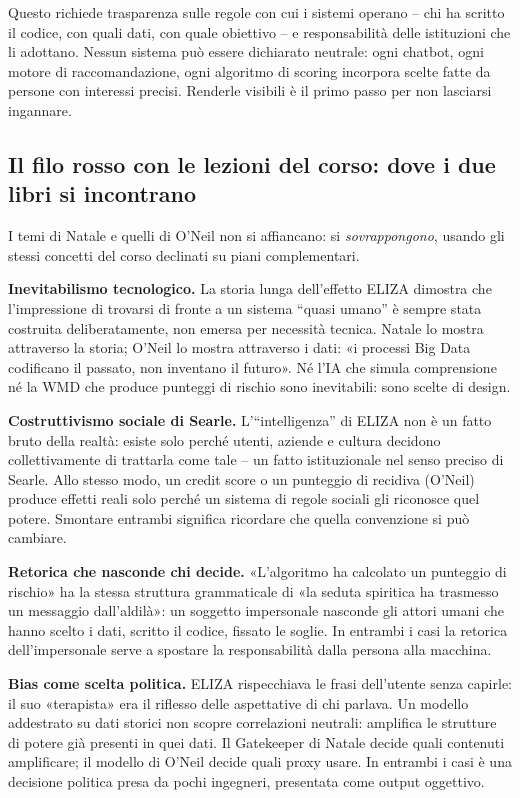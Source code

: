 \documentclass[a4paper,11pt]{article}
\begin{document}
Questo richiede trasparenza sulle regole con cui i sistemi operano -- chi ha scritto il codice, con quali dati, con quale obiettivo -- e responsabilità delle istituzioni che li adottano. Nessun sistema può essere dichiarato neutrale: ogni chatbot, ogni motore di raccomandazione, ogni algoritmo di scoring incorpora scelte fatte da persone con interessi precisi. Renderle visibili è il primo passo per non lasciarsi ingannare.

\subsection{Il filo rosso con le lezioni del corso: dove i due libri si incontrano}

I temi di Natale e quelli di O'Neil non si affiancano: si \emph{sovrappongono}, usando gli stessi concetti del corso declinati su piani complementari.

\textbf{Inevitabilismo tecnologico.} La storia lunga dell'effetto ELIZA dimostra che l'impressione di trovarsi di fronte a un sistema ``quasi umano'' è sempre stata costruita deliberatamente, non emersa per necessità tecnica. Natale lo mostra attraverso la storia; O'Neil lo mostra attraverso i dati: «i processi Big Data codificano il passato, non inventano il futuro». Né l'IA che simula comprensione né la WMD che produce punteggi di rischio sono inevitabili: sono scelte di design.

\textbf{Costruttivismo sociale di Searle.} L'``intelligenza'' di ELIZA non è un fatto bruto della realtà: esiste solo perché utenti, aziende e cultura decidono collettivamente di trattarla come tale -- un fatto istituzionale nel senso preciso di Searle. Allo stesso modo, un credit score o un punteggio di recidiva (O'Neil) produce effetti reali solo perché un sistema di regole sociali gli riconosce quel potere. Smontare entrambi significa ricordare che quella convenzione si può cambiare.

\textbf{Retorica che nasconde chi decide.} «L'algoritmo ha calcolato un punteggio di rischio» ha la stessa struttura grammaticale di «la seduta spiritica ha trasmesso un messaggio dall'aldilà»: un soggetto impersonale nasconde gli attori umani che hanno scelto i dati, scritto il codice, fissato le soglie. In entrambi i casi la retorica dell'impersonale serve a spostare la responsabilità dalla persona alla macchina.

\textbf{Bias come scelta politica.} ELIZA rispecchiava le frasi dell'utente senza capirle: il suo «terapista» era il riflesso delle aspettative di chi parlava. Un modello addestrato su dati storici non scopre correlazioni neutrali: amplifica le strutture di potere già presenti in quei dati. Il Gatekeeper di Natale decide quali contenuti amplificare; il modello di O'Neil decide quali proxy usare. In entrambi i casi è una decisione politica presa da pochi ingegneri, presentata come output oggettivo.
\end{document}

